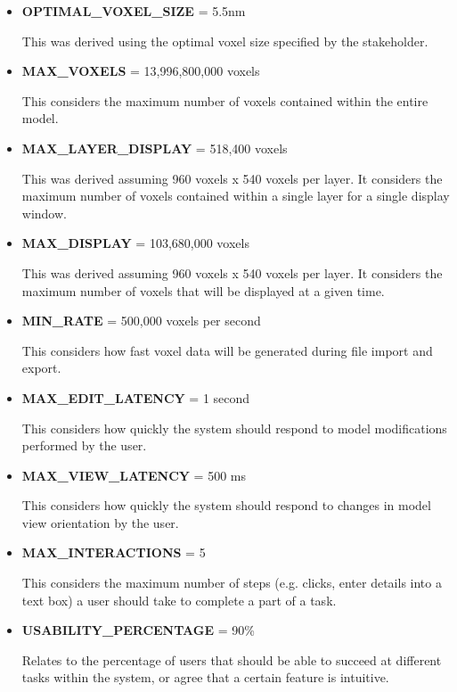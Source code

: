 \documentclass[12pt, titlepage]{article}
\begin{document}
\begin{itemize}
  \item \textbf{OPTIMAL\_VOXEL\_SIZE} = 5.5nm
  
  This was derived using the optimal voxel size specified by the stakeholder.
  
  \item \textbf{MAX\_VOXELS} = 13,996,800,000 voxels
  
  This considers the maximum number of voxels contained within the entire model.
  
  \item \textbf{MAX\_LAYER\_DISPLAY} = 518,400 voxels
  
  This was derived assuming 960 voxels x 540 voxels per layer. It considers the maximum number of voxels contained within a single layer for a single display window.
  
  \item \textbf{MAX\_DISPLAY} = 103,680,000 voxels
  
  This was derived assuming 960 voxels x 540 voxels per layer. It considers the maximum number of voxels that will be displayed at a given time.
  
  \item \textbf{MIN\_RATE} = 500,000 voxels per second
  
  This considers how fast voxel data will be generated during file import and export.
  
  \item \textbf{MAX\_EDIT\_LATENCY} = 1 second
  
  This considers how quickly the system should respond to model modifications performed by the user.
  
  \item \textbf{MAX\_VIEW\_LATENCY} = 500 ms
  
  This considers how quickly the system should respond to changes in model view orientation by the user.
  
  \item \textbf{MAX\_INTERACTIONS} = 5
  
  This considers the maximum number of steps (e.g. clicks, enter details into a text box) a user should take to complete a part of a task.

  \item \textbf{USABILITY\_PERCENTAGE} = 90\%

  Relates to the percentage of users that should be able to succeed at different tasks within the system, or agree that a certain feature is intuitive.

\end{itemize}
\end{document}
